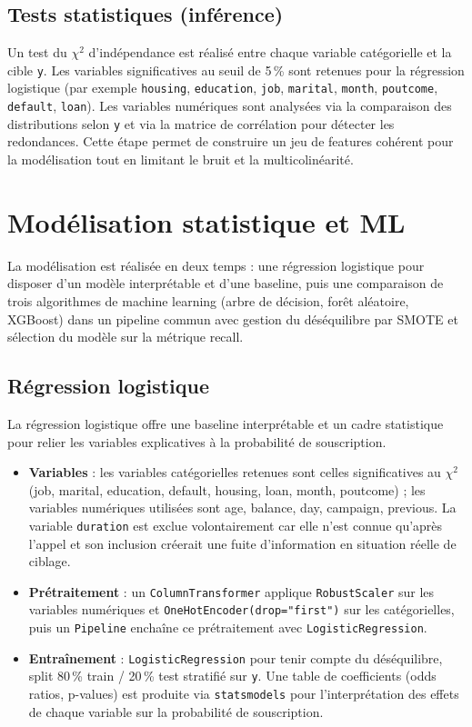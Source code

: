 \documentclass[11pt,a4paper]{article}
\begin{document}
\subsection{Tests statistiques (inférence)}
Un test du $\chi^2$ d'indépendance est réalisé entre chaque variable catégorielle et la cible \texttt{y}. Les variables significatives au seuil de 5\,\% sont retenues pour la régression logistique (par exemple \texttt{housing}, \texttt{education}, \texttt{job}, \texttt{marital}, \texttt{month}, \texttt{poutcome}, \texttt{default}, \texttt{loan}). Les variables numériques sont analysées via la comparaison des distributions selon \texttt{y} et via la matrice de corrélation pour détecter les redondances. Cette étape permet de construire un jeu de features cohérent pour la modélisation tout en limitant le bruit et la multicolinéarité.

\section{Modélisation statistique et ML}

La modélisation est réalisée en deux temps : une régression logistique pour disposer d'un modèle interprétable et d'une baseline, puis une comparaison de trois algorithmes de machine learning (arbre de décision, forêt aléatoire, XGBoost) dans un pipeline commun avec gestion du déséquilibre par SMOTE et sélection du modèle sur la métrique recall.

\subsection{Régression logistique}
La régression logistique offre une baseline interprétable et un cadre statistique pour relier les variables explicatives à la probabilité de souscription.
\begin{itemize}
  \item \textbf{Variables} : les variables catégorielles retenues sont celles significatives au $\chi^2$ (job, marital, education, default, housing, loan, month, poutcome) ; les variables numériques utilisées sont age, balance, day, campaign, previous. La variable \texttt{duration} est exclue volontairement car elle n'est connue qu'après l'appel et son inclusion créerait une fuite d'information en situation réelle de ciblage.
  \item \textbf{Prétraitement} : un \texttt{ColumnTransformer} applique \texttt{RobustScaler} sur les variables numériques et \texttt{OneHotEncoder(drop="first")} sur les catégorielles, puis un \texttt{Pipeline} enchaîne ce prétraitement avec \texttt{LogisticRegression}.
  \item \textbf{Entraînement} : \texttt{LogisticRegression} pour tenir compte du déséquilibre, split 80\,\% train / 20\,\% test stratifié sur \texttt{y}. Une table de coefficients (odds ratios, p-values) est produite via \texttt{statsmodels} pour l'interprétation des effets de chaque variable sur la probabilité de souscription.
\end{itemize}
\end{document}
